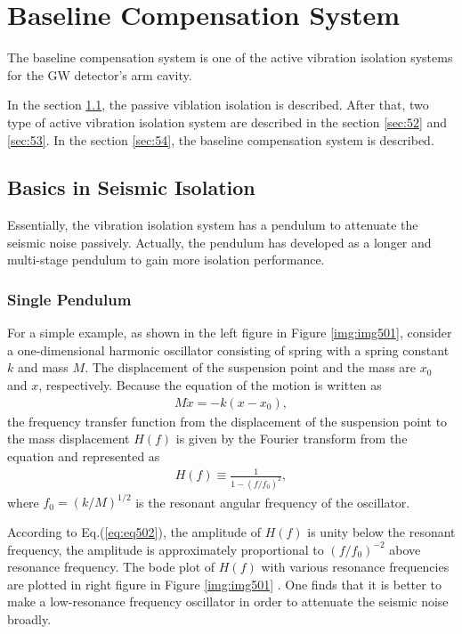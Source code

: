 \chapter{Baseline Compensation System} \label{chap4}
The baseline compensation system is one of the active vibration isolation systems for the GW detector's arm cavity. 

In the section \cref{sec:51}, the passive viblation isolation is described. After that, two type of active vibration isolation system are described in the section \cref{sec:52} and \cref{sec:53}. In the section \cref{sec:54}, the baseline compensation system is described.

\section{Basics in Seismic Isolation}\label{sec:51}
Essentially, the vibration isolation system has a pendulum to attenuate the seismic noise passively.  Actually, the pendulum has developed as a longer and multi-stage pendulum to gain more isolation performance.

\subsection{Single Pendulum}
For a simple example, as shown in the left figure in Figure \ref{img:img501}, consider a one-dimensional harmonic oscillator consisting of spring with a spring constant $k$ and mass $M$. The displacement of the suspension point and the mass are $x_0$ and $x$, respectively. Because the equation of the motion is written as
\begin{eqnarray} \label{eq:eq501}
  M\ddot{x} = -k(x-x_0),
\end{eqnarray}
the frequency transfer function from the displacement of the suspension point to the mass displacement $H(f)$ is given by the Fourier transform from the equation and represented as
\begin{eqnarray} \label{eq:eq502}
  H(f) \equiv \frac{1}{1-(f/f_0)^2},
\end{eqnarray}
where $f_0 = (k/M)^{1/2}$ is the resonant angular frequency of the oscillator.

According to Eq.(\ref{eq:eq502}), the amplitude of $H(f)$ is unity below the resonant frequency, the amplitude is approximately proportional to $(f/f_0)^{-2}$ above resonance frequency. The bode plot of $H(f)$ with various resonance frequencies are plotted in right figure in Figure \ref{img:img501} . One finds that it is better to make a low-resonance frequency oscillator in order to attenuate the seismic noise broadly. 

